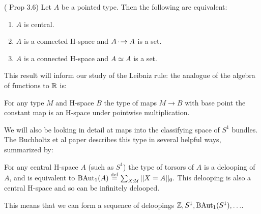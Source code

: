 \begin{myprop}
(\cite{buchholtz2023central} Prop 3.6) Let \( A \) be a pointed type. Then the following are equivalent:
\begin{enumerate}
\item \( A \) is central.
\item \( A \) is a connected H-space and \( A\,\cdot\!\to A \) is a set.
\item \( A \) is a connected H-space and \( A\simeq A \) is a set.
\end{enumerate}
\end{myprop}

This result will inform our study of the Leibniz rule: the analogue of the algebra of functions to \( \mathbb{R} \) is:
\begin{myprop}
For any type \( M \) and H-space \( B \) the type of maps \( M\to B \) with base point the constant map is an H-space under pointwise multiplication.
\end{myprop}

We will also be looking in detail at maps into the classifying space of \( S^1 \) bundles. The Buchholtz et al paper\cite{buchholtz2023central} describes this type in several helpful ways, summarized by:

\begin{mythm}
For any central H-space \( A \) (such as \( S^1 \)) the type of torsors of \( A \) is a delooping of \( A \), and is equivalent to \( \mathrm{BAut}_1(A)\stackrel{\mathrm{def}}{=} \sum_{X:\mathcal{U}}||X=A||_0. \) This delooping is also a central H-space and so can be infinitely delooped.
\end{mythm}

This means that we can form a sequence of deloopings \( \mathbb{Z}, S^1, \mathrm{BAut}_1(S^1), \ldots \).



